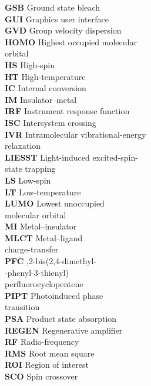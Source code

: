 \documentclass[12pt]{ut-thesis}
\begin{document}
\begin{preliminary}
\begin{multicols}{2}
\begin{tabbing}
      \textbf{GSB} \> Ground state bleach \\
      \textbf{GUI} \> Graphics user interface \\
      \textbf{GVD} \> Group velocity dispersion \\
      \textbf{HOMO} \> Highest occupied molecular \\
        \> orbital\\
      \textbf{HS} \> High-spin \\
      \textbf{HT} \> High-temperature \\
      \textbf{IC} \> Internal conversion \\
      \textbf{IM} \> Insulator--metal \\
      \textbf{IRF} \> Instrument response function\\
      \textbf{ISC} \> Intersystem crossing\\
      \textbf{IVR} \> Intramolecular vibrational-energy \\
        \> relaxation \\
      \textbf{LIESST} \> Light-induced excited-spin-\\
        \> state trapping \\
      \textbf{LS} \> Low-spin \\
      \textbf{LT} \> Low-temperature \\
      \textbf{LUMO} \> Lowest unoccupied \\
        \> molecular orbital\\
      \textbf{MI} \> Metal--insulator\\
      \textbf{MLCT} \> Metal--ligand \\
        \> charge-transfer \\
      \textbf{PFC} ,2-bis(2,4-dimethyl- \\
        -phenyl-3-thienyl) \\
        \> perfluorocyclopentene \\
      \textbf{PIPT} \> Photoinduced phase \\
        \> transition \\
      \textbf{PSA} \> Product state absorption \\
      \textbf{REGEN} \> Regenerative amplifier \\
      \textbf{RF} \> Radio-frequency \\
      \textbf{RMS} \> Root mean square \\
      \textbf{ROI} \> Region of interest \\
      \textbf{SCO} \> Spin crossover \\

\end{tabbing}
\end{multicols}
\end{preliminary}
\end{document}
